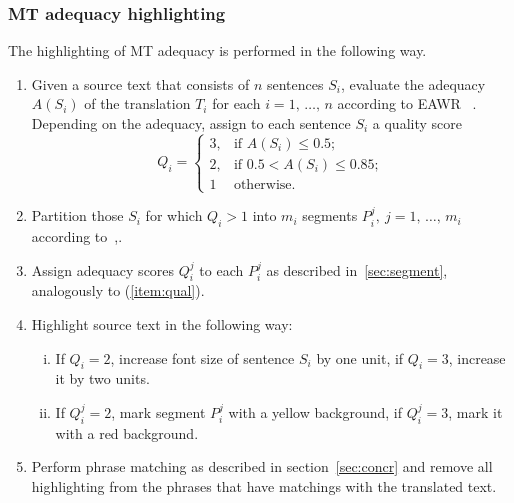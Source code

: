 \documentclass[hidelinks,10pt,letter]{article} %
\begin{document}
    \subsubsection{MT adequacy highlighting}\label{sec:algad}
    The highlighting of MT adequacy is performed in the following way.
    \begin{enumerate}[(1)]
        \item\label{item:qual} 
            Given a source text that consists of $n$ sentences $S_i$, 
            evaluate the adequacy $A(S_i)$ of the translation $T_i$
            for each $i=1,\,\dots,\,n$ according to EAWR%
            ~\cite{mehdad2012match}.
            Depending on the adequacy, assign to each sentence $S_i$ a quality score
            \[
                Q_i=
                    \begin{cases}
                      3,&\text{if }A(S_i)\leq0.5;\\
                      2,&\text{if }0.5<A(S_i)\leq0.85;\\
                      1&\text{otherwise.}
                    \end{cases}
            \]
        \item\label{item:part} 
            Partition those $S_i$ for which $Q_i>1$ into $m_i$ segments $P_i^j,\ j=1,\,\dots,\,m_i$ according to~\cite{marcu1997rhetorical},.
        \item\label{item:qualpart} 
            Assign adequacy scores $Q_i^j$ to each $P_i^j$ as described in~\ref{sec:segment}, analogously to (\ref{item:qual}).
        \item\label{item:high} 
            Highlight source text in the following way:
            \begin{enumerate}[(i)]
                \item If $Q_i=2$, increase font size of sentence $S_i$ by one unit, if $Q_i=3$, increase it by two units.
                \item If $Q_i^j=2$, mark segment $P_i^j$ with a yellow background, if $Q_i^j=3$, mark it with a red background.
            \end{enumerate}
        \item Perform phrase matching as described in section~\ref{sec:concr} and remove all highlighting from the phrases that have matchings with the translated text.
    \end{enumerate}
    
    
\end{document}
